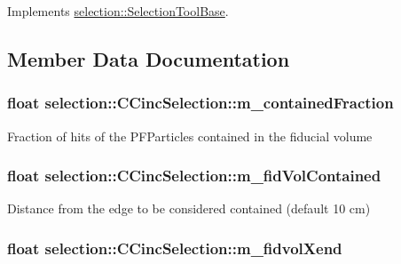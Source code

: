 Implements \hyperlink{classselection_1_1SelectionToolBase_ab63818dac49b43418fe9eb3b8cd98c9c}{selection\-::\-Selection\-Tool\-Base}.



\subsection{Member Data Documentation}
\hypertarget{classselection_1_1CCincSelection_a5ac3c52c6a88691182c3b3c6594d9744}{
\subsubsection[{m\-\_\-contained\-Fraction}]{\setlength{\rightskip}{0pt plus 5cm}float selection\-::\-C\-Cinc\-Selection\-::m\-\_\-contained\-Fraction\hspace{0.3cm}{\ttfamily [private]}}}\label{classselection_1_1CCincSelection_a5ac3c52c6a88691182c3b3c6594d9744}
Fraction of hits of the P\-F\-Particles contained in the fiducial volume \hypertarget{classselection_1_1CCincSelection_a3412d86b03a97a65fed3d5d8a41ed2c0}{
\subsubsection[{m\-\_\-fid\-Vol\-Contained}]{\setlength{\rightskip}{0pt plus 5cm}float selection\-::\-C\-Cinc\-Selection\-::m\-\_\-fid\-Vol\-Contained\hspace{0.3cm}{\ttfamily [private]}}}\label{classselection_1_1CCincSelection_a3412d86b03a97a65fed3d5d8a41ed2c0}
Distance from the edge to be considered contained (default 10 cm) \hypertarget{classselection_1_1CCincSelection_ae4bab4cf8ea55e54fcdaa66d2fe44c1d}{
\subsubsection[{m\-\_\-fidvol\-Xend}]{\setlength{\rightskip}{0pt plus 5cm}float selection\-::\-C\-Cinc\-Selection\-::m\-\_\-fidvol\-Xend\hspace{0.3cm}{\ttfamily [private]}}}\label{classselection_1_1CCincSelection_ae4bab4cf8ea55e54fcdaa66d2fe44c1d}
